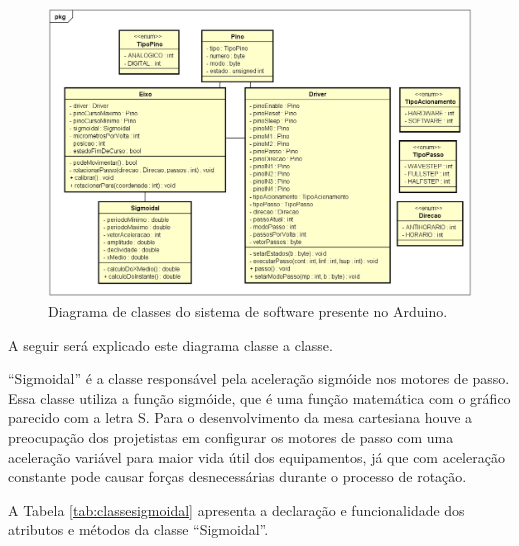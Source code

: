 \begin{landscape}
\begin{figure}[H]
\centering
\caption{Diagrama de classes do sistema de software presente no Arduino.}\label{fig:diagramaclasses}
\includegraphics[scale = 0.65]{figuras/diagramaclasses}
\end{figure}
\end{landscape}

A seguir será explicado este diagrama classe a classe.

“Sigmoidal” é a classe responsável pela aceleração sigmóide nos motores de passo. Essa classe utiliza 
a função sigmóide, que é uma função matemática com o gráfico parecido com a letra S. Para o desenvolvimento 
da mesa cartesiana houve a preocupação dos projetistas em configurar os motores de passo com uma aceleração 
variável para maior vida útil dos equipamentos, já que com aceleração constante pode causar forças 
desnecessárias durante o processo de rotação.

A Tabela \ref{tab:classesigmoidal} apresenta a declaração e funcionalidade dos atributos e métodos 
da classe “Sigmoidal”.

